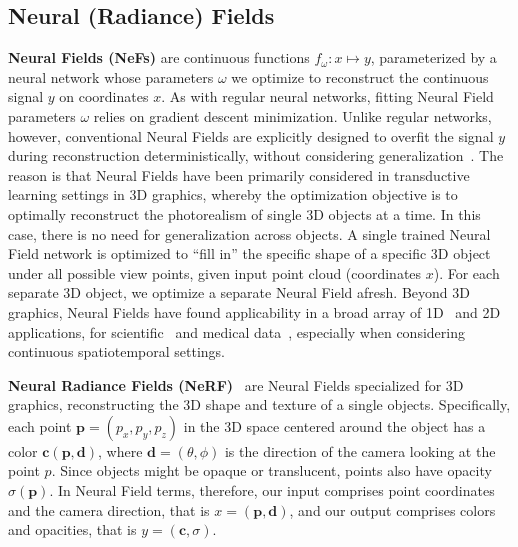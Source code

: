 \subsection{Neural (Radiance) Fields}

\textbf{Neural Fields (NeFs)} \cite{sitzmann2020implicit} are continuous functions $f_\omega \colon x \mapsto y$, parameterized by a neural network whose parameters $\omega$ we optimize to reconstruct the continuous signal $y$ on coordinates $x$.
As with regular neural networks, fitting Neural Field parameters $\omega$ relies on gradient descent minimization.
Unlike regular networks, however, conventional Neural Fields are explicitly designed to overfit the signal $y$ during reconstruction deterministically, without considering generalization~\citep{mildenhall2021nerf,barron2021mip}.
The reason is that Neural Fields have been primarily considered in transductive learning settings in 3D graphics, whereby the optimization objective is to optimally reconstruct the photorealism of single 3D objects at a time.
In this case, there is no need for generalization across objects.
A single trained Neural Field network is optimized to ``fill in'' the specific shape of a specific 3D object under all possible view points, given input point cloud (coordinates $x$).
For each separate 3D object, we optimize a separate Neural Field afresh.
Beyond 3D graphics, Neural Fields have found applicability in a broad array of 1D~\citep{yin2022continuous} and 2D~\citep{chen2023neurbf} applications, for scientific~\citep{raissi2019physics} and medical data~\citep{de2023spatio}, especially when considering continuous spatiotemporal settings.

\textbf{Neural Radiance Fields (NeRF)}~\citep{mildenhall2021nerf, arandjelovic2021nerf} are Neural Fields specialized for 3D graphics, reconstructing the 3D shape and texture of a single objects.
Specifically, each point \(\mathbf{p} = (p_x, p_y, p_z)\) in the 3D space centered around the object has a color \(\mathbf{c}(\mathbf{p},
 \mathbf{d})\), where \(\mathbf{d} = (\theta, \phi)\) is the direction of the camera looking at the point $p$.
Since objects might be opaque or translucent, points also have opacity \(\sigma(\mathbf{p})\).
In Neural Field terms, therefore, our input comprises point coordinates and the camera direction, that is $x=(\mathbf{p}, \mathbf{d})$, and our output comprises colors and opacities, that is \(y = (\mathbf{c}, \sigma)\).


